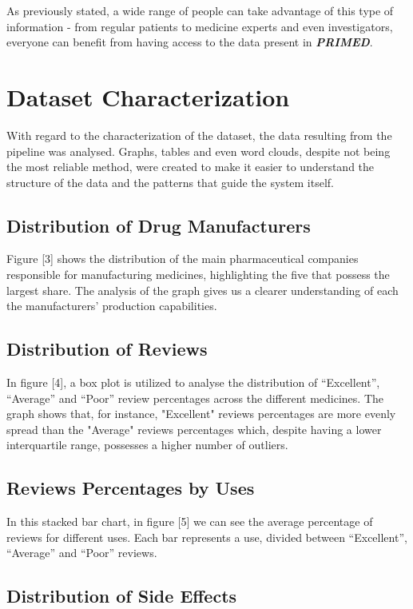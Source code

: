 \documentclass[sigconf]{acmart}
\begin{document}
As previously stated, a wide range of people can take advantage of this type of information - from regular patients to medicine experts and even investigators, everyone can benefit from having access to the data present in \textit{\textbf{PRIMED}}.

\section{Dataset Characterization}

With regard to the characterization of the dataset, the data resulting from the pipeline was analysed. Graphs, tables and even word clouds, despite not being the most reliable method, were created to make it easier to understand the structure of the data and the patterns that guide the system itself.

\subsection{Distribution of Drug Manufacturers}

Figure [3] shows the distribution of the main pharmaceutical companies responsible for manufacturing medicines, highlighting the five that possess the largest share. The analysis of the graph gives us a clearer understanding of each the manufacturers' production capabilities.

\subsection{Distribution of Reviews}

In figure [4], a box plot is utilized to analyse the distribution of “Excellent”, “Average” and “Poor” review percentages across the different medicines. The graph shows that, for instance, "Excellent" reviews percentages are more evenly spread than the "Average" reviews percentages which, despite having a lower interquartile range\cite{iqrange}, possesses a higher number of outliers.

\subsection{Reviews Percentages by Uses}

In this stacked bar chart, in figure [5] we can see the average percentage of reviews for different uses. Each bar represents a use, divided between “Excellent”, “Average” and “Poor” reviews. 

\subsection{Distribution of Side Effects}
\end{document}
